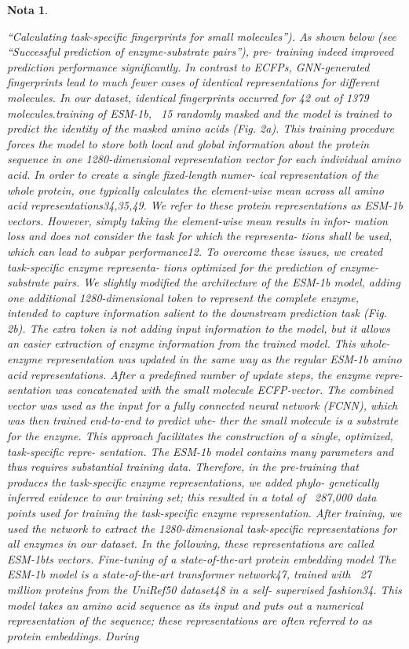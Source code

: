 \documentclass[12pt]{article}
\newtheorem{Note}{Nota}%
\begin{document}
\begin{Note}
\begin{itemize}
“Calculating task-speciﬁc ﬁngerprints for small molecules”). As shown
below (see “Successful prediction of enzyme-substrate pairs”), pre-
training indeed improved prediction performance signiﬁcantly. In
contrast to ECFPs, GNN-generated ﬁngerprints lead to much fewer
cases of identical representations for different molecules. In our
dataset, identical ﬁngerprints occurred for 42 out of 1379 molecules.training of ESM-1b, ~15%
randomly masked and the model is trained to predict the identity of
the masked amino acids (Fig. 2a). This training procedure forces the
model to store both local and global information about the protein
sequence in one 1280-dimensional representation vector for each
individual amino acid. In order to create a single ﬁxed-length numer-
ical representation of the whole protein, one typically calculates the
element-wise mean across all amino acid representations34,35,49. We
refer to these protein representations as ESM-1b vectors.
However, simply taking the element-wise mean results in infor-
mation loss and does not consider the task for which the representa-
tions shall be used, which can lead to subpar performance12. To
overcome these issues, we created task-speciﬁc enzyme representa-
tions optimized for the prediction of enzyme-substrate pairs. We
slightly modiﬁed the architecture of the ESM-1b model, adding one
additional 1280-dimensional token to represent the complete enzyme,
intended to capture information salient to the downstream prediction
task (Fig. 2b). The extra token is not adding input information to the
model, but it allows an easier extraction of enzyme information from
the trained model. This whole-enzyme representation was updated in
the same way as the regular ESM-1b amino acid representations.
After a predeﬁned number of update steps, the enzyme repre-
sentation was concatenated with the small molecule ECFP-vector. The
combined vector was used as the input for a fully connected neural
network (FCNN), which was then trained end-to-end to predict whe-
ther the small molecule is a substrate for the enzyme. This approach
facilitates the construction of a single, optimized, task-speciﬁc repre-
sentation. The ESM-1b model contains many parameters and thus
requires substantial training data. Therefore, in the pre-training that
produces the task-speciﬁc enzyme representations, we added phylo-
genetically inferred evidence to our training set; this resulted in a total
of ~287,000 data points used for training the task-speciﬁc enzyme
representation. After training, we used the network to extract the
1280-dimensional task-speciﬁc representations for all enzymes in our
dataset. In the following, these representations are called ESM-1bts
vectors.
Fine-tuning of a state-of-the-art protein embedding model
The ESM-1b model is a state-of-the-art transformer network47, trained
with ~27 million proteins from the UniRef50 dataset48 in a self-
supervised fashion34. This model takes an amino acid sequence as its
input and puts out a numerical representation of the sequence; these
representations are often referred to as protein embeddings. During


\end{itemize}
\end{Note}
\end{document}

